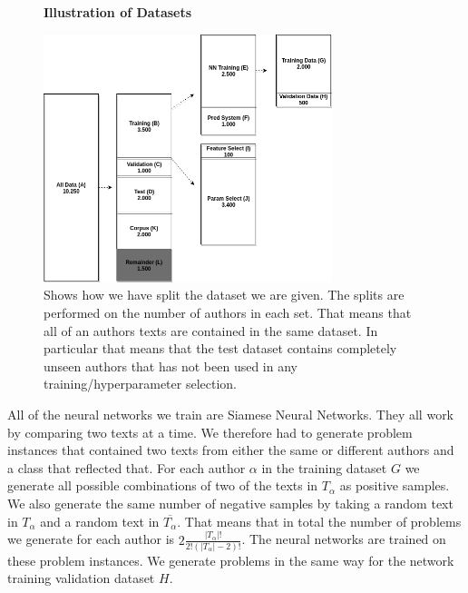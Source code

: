 \begin{figure}
    \centering
    \textbf{Illustration of Datasets}\par\medskip
    \includegraphics[width=0.75\textwidth]{./pictures/data/Data.png}
    \caption{Shows how we have split the dataset we are given. The splits are
        performed on the number of authors in each set. That means that all of
        an authors texts are contained in the same dataset. In particular that
        means that the test dataset contains completely unseen authors that has
        not been used in any training/hyperparameter selection.}
    \label{fig:data_split}
\end{figure}

All of the neural networks we train are Siamese Neural Networks. They all
work by comparing two texts at a time. We therefore had to generate problem
instances that contained two texts from either the same or different authors and
a class that reflected that. For each author $\alpha$ in the training dataset
$G$ we generate all possible combinations of two of the texts in $T_\alpha$
as positive samples. We also generate the same number of negative samples by
taking a random text in $T_\alpha$ and a random text in $\overline{T_\alpha}$.
That means that in total the number of problems we generate for each author
is $2\frac{\left|T_\alpha\right|!}{2!(\left|T_\alpha\right|-2)!}$. The neural
networks are trained on these problem instances. We generate problems in the
same way for the network training validation dataset $H$.
